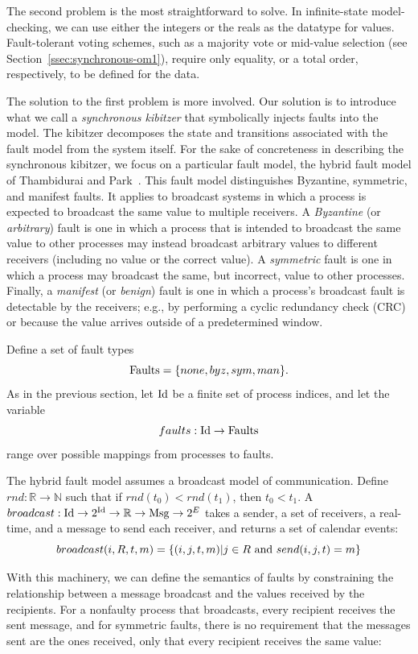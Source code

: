 The second problem is the most straightforward to solve. In
infinite-state model-checking, we can use either the integers or
the reals as the datatype for values. Fault-tolerant voting schemes,
such as a majority vote or mid-value selection (see Section~\ref{ssec:synchronous-om1}),
require only equality, or a total order, respectively, to be defined
for the data.

The solution to the first problem is more involved. Our solution
is to introduce what we call a \emph{synchronous kibitzer} that
symbolically injects faults into the model. The kibitzer decomposes
the state and transitions associated with the fault model from the
system itself. For the sake of concreteness in describing the
synchronous kibitzer, we focus on a particular fault model, the
hybrid fault model of Thambidurai and Park~\cite{Tha88:RDSS}. This fault
model distinguishes Byzantine, symmetric, and manifest faults. It
applies to broadcast systems in which a process is expected to
broadcast the same value to multiple receivers. A \emph{Byzantine}
(or \emph{arbitrary}) fault is one in which a process that is
intended to broadcast the same value to other processes may instead
broadcast arbitrary values to different receivers (including no
value or the correct value). A \emph{symmetric} fault is one in
which a process may broadcast the same, but incorrect, value to
other processes. Finally, a \emph{manifest} (or \emph{benign}) fault
is one in which a process's broadcast fault is detectable by the
receivers; e.g., by performing a cyclic redundancy check (CRC) or
because the value arrives outside of a predetermined window.

Define a set of fault types $$\textnormal{Faults} = \{none, byz,
sym, man\}.$$ As in the previous section, let $\mathrm{Id}$ be a finite set
of process indices, and let the variable $$faults: \mathrm{Id} \rightarrow
\textnormal{Faults}$$ range over possible mappings from processes
to faults.

The hybrid fault model assumes a broadcast model of communication.
Define $rnd: \mathbb{R} \rightarrow \mathbb{N}$ such that if
$rnd(t_0) < rnd(t_1)$, then $t_0 < t_1$.  A $broadcast: \mathrm{Id} \rightarrow
2^{\mathrm{Id}} \rightarrow \mathbb{R} \rightarrow \mathrm{Msg} \rightarrow 2^{E}$
takes a sender, a set of receivers, a real-time, and a message to
send each receiver, and returns a set of calendar events: $$broadcast(i,
R, t, m) = \{ (i,j,t,m) | j \in R \textnormal{ and } send(i, j, t) = m\}$$

With this machinery, we can define the semantics of faults by
constraining the relationship between a message broadcast and the
values received by the recipients. For a nonfaulty process that
broadcasts, every recipient receives the sent message, and for
symmetric faults, there is no requirement that the messages sent
are the ones received, only that every recipient receives the same
value:

